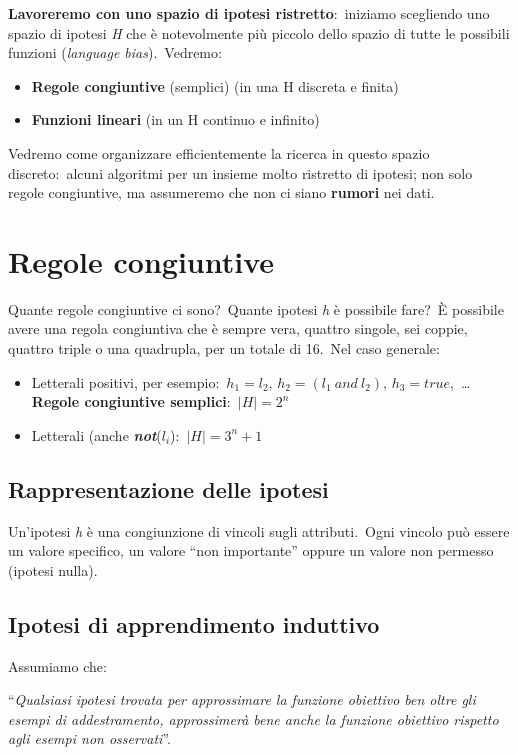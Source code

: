\textbf{Lavoreremo con uno spazio di ipotesi ristretto}:\ iniziamo scegliendo uno spazio di ipotesi \textit{H} che è notevolmente più piccolo dello spazio di tutte le possibili funzioni (\textit{language bias}).\
Vedremo:
\begin{itemize}
	\item \textbf{Regole congiuntive} (semplici) (in una H discreta e finita)
	\item \textbf{Funzioni lineari} (in un H continuo e infinito)
\end{itemize}

\noindent Vedremo come organizzare efficientemente la ricerca in questo spazio discreto:\ alcuni algoritmi per un insieme molto ristretto di ipotesi; non solo regole congiuntive, ma assumeremo che non ci siano \textbf{rumori} nei dati.\

\section{Regole congiuntive}

Quante regole congiuntive ci sono?\
Quante ipotesi \textit{h} è possibile fare?\
È possibile avere una regola congiuntiva che è sempre vera, quattro singole, sei coppie, quattro triple o una quadrupla, per un totale di 16.\
Nel caso generale:
\begin{itemize}
	\item Letterali positivi, per esempio:\ $h_1 = l_2$, $h_2 = (l_1\ and\ l_2)$, $h_3 = true$,\ \dots\
	      \textbf{	Regole congiuntive semplici}:\ $|H| = 2^n$
	\item Letterali (anche \textbf{\textit{not}}($l_i$):\ $|H| = 3^n+1$
\end{itemize}

\subsection{Rappresentazione delle ipotesi}

Un'ipotesi \textit{h} è una congiunzione di vincoli sugli attributi.\
Ogni vincolo può essere un valore specifico, un valore ``non importante'' oppure un valore non permesso (ipotesi nulla).\

\subsection{Ipotesi di apprendimento induttivo}

Assumiamo che:

\vspace{12pt}
\noindent``\textit{Qualsiasi ipotesi trovata per approssimare la funzione obiettivo ben oltre gli esempi di addestramento, approssimerà bene anche la funzione obiettivo rispetto agli esempi non osservati}''.

